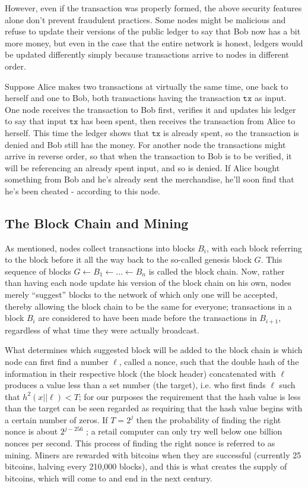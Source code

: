 \documentclass[a4paper,12pt]{article}
\begin{document}
However, even if the transaction was properly formed, the above security features alone don't prevent fraudulent practices. Some nodes might be malicious and refuse to update their versions of the public ledger to say that Bob now has a bit more money, but even in the case that the entire network is honest, ledgers would be updated differently simply because transactions arrive to nodes in different order.

Suppose Alice makes two transactions at virtually the same time, one back to herself and one to Bob, both transactions having the transaction $\texttt{tx}$ as input. One node receives the transaction to Bob first, verifies it and updates his ledger to say that input $\texttt{tx}$ has been spent, then receives the transaction from Alice to herself. This time the ledger shows that $\texttt{tx}$ is already spent, so the transaction is denied and Bob still has the money. For another node the transactions might arrive in reverse order, so that when the transaction to Bob is to be verified, it will be referencing an already spent input, and so is denied. If Alice bought something from Bob and he's already sent the merchandise, he'll soon find that he's been cheated - according to this node.

\subsection{The Block Chain and Mining}

As mentioned, nodes collect transactions into blocks $B_i$, with each block referring to the block before it all the way back to the so-called genesis block $G$. This sequence of blocks $G \leftarrow B_1 \leftarrow ... \leftarrow B_n$ is called the block chain. Now, rather than having each node update his version of the block chain on his own, nodes merely “suggest” blocks to the network of which only one will be accepted, thereby allowing the block chain to be the same for everyone; transactions in a block $B_i$ are considered to have been made before the transactions in $B_{i+1}$, regardless of what time they were actually broadcast. \cite{blockchain}

What determines which suggested block will be added to the block chain is which node can first find a number $\ell$, called a nonce, such that the double hash of the information in their respective block (the block header) concatenated with $\ell$ produces a value less than a set number (the target), i.e. who first finds $\ell$ such that $h^2(x|| \ell) < T$; for our purposes the requirement that the hash value is less than the target can be seen regarded as requiring that the hash value begins with a certain number of zeros. If $T = 2^{j}$ then the probability of finding the right nonce is about $2^{j-256}$ \cite[p. 12]{kobmen}; a retail computer can only try well below one billion nonces per second. \cite{hashretail} This process of finding the right nonce is referred to as mining. Miners are rewarded with bitcoins when they are successful (currently 25 bitcoins, halving every 210,000 blocks), and this is what creates the supply of bitcoins, which will come to and end in the next century.
\end{document}
